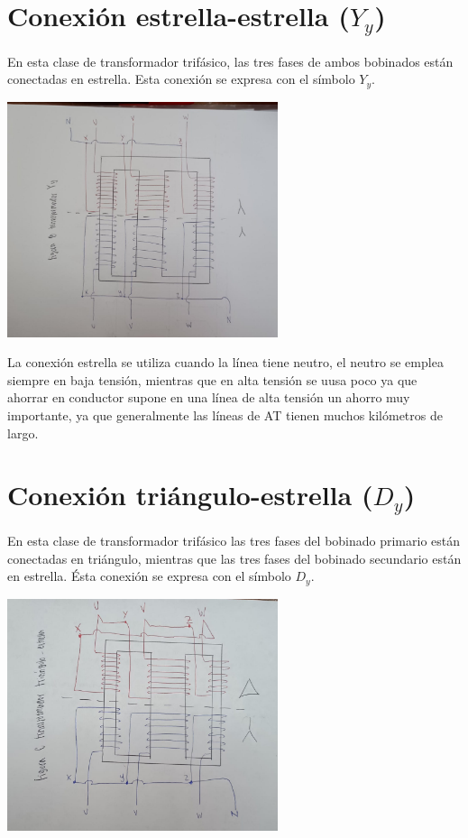 \documentclass[11pt]{report}
\begin{document}
\section{Conexión estrella-estrella ($Y_y$)}
En esta clase de transformador trifásico, las tres fases de ambos bobinados
están conectadas en estrella. Esta conexión se expresa con el símbolo $Y_y$.

\begin{center}
  \includegraphics[width=300px]{trafo-conexion-yy.jpeg}
\end{center}

La conexión estrella se utiliza cuando la línea tiene neutro, el neutro se
emplea siempre en baja tensión, mientras que en alta tensión se uusa poco ya
que ahorrar en conductor supone en una línea de alta tensión un ahorro muy
importante, ya que generalmente las líneas de AT tienen muchos kilómetros de
largo.

\pagebreak
\section{Conexión triángulo-estrella ($D_y$)}
En esta clase de transformador trifásico las tres fases del bobinado primario
están conectadas en triángulo, mientras que las tres fases del bobinado
secundario están en estrella. Ésta conexión se expresa con el símbolo $D_y$.

\begin{center}
  \includegraphics[width=300px]{trafo-conexion-dy.jpeg}
\end{center}
\pagebreak
\end{document}

